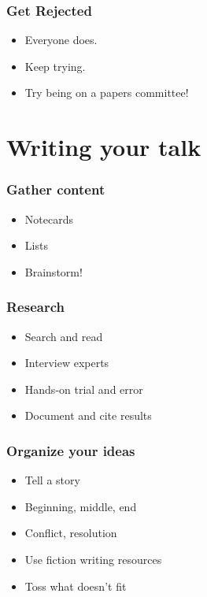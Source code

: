 \documentclass{beamer}
\begin{document}
\begin{frame}[fragile]
\frametitle{Get Rejected}
\begin{itemize}[<+(1)->]
\item Everyone does.
\item Keep trying.
\item Try being on a papers committee!
\end{itemize}
\end{frame}

\section{Writing your talk}

\begin{frame}[fragile]
\tableofcontents[currentsection]
\end{frame}

\begin{frame}[fragile]
\frametitle{Gather content}
\begin{itemize}[<+(1)->]
\item Notecards
\item Lists
\item Brainstorm!
\end{itemize}
\end{frame}

\begin{frame}[fragile]
\frametitle{Research}
\begin{itemize}[<+(1)->]
\item Search and read
\item Interview experts
\item Hands-on trial and error
\item Document and cite results
\end{itemize}
\end{frame}

\begin{frame}[fragile]
\frametitle{Organize your ideas}
\begin{itemize}[<+(1)->]
\item Tell a story
\item Beginning, middle, end
\item Conflict, resolution
\item Use fiction writing resources
\item Toss what doesn't fit
\end{itemize}
\end{frame}
\end{document}
